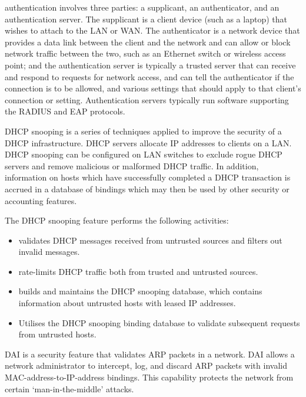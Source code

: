 {\begin{description}
    authentication involves three parties: a supplicant, an authenticator, and an authentication server.
   The supplicant is a client device (such as a laptop) that wishes to attach to the \ac{LAN} or \ac{WAN}.
   The authenticator is a network device that provides a data link between the client and the network and can allow or block network traffic between the two, such as an Ethernet switch or wireless access point; and the authentication server is typically a trusted server that can receive and respond to requests for network access, and can tell the authenticator if the connection is to be allowed, and various settings that should apply to that client's connection or setting.
   Authentication servers typically run software supporting the \ac{RADIUS} and \ac{EAP} protocols.
\item[\ac{DHCP} snooping]
   \ac{DHCP} snooping is a series of techniques applied to improve the security of a \ac{DHCP} infrastructure.
   \ac{DHCP} servers allocate \ac{IP} addresses to clients on a \ac{LAN}.
   \ac{DHCP} snooping can be configured on \ac{LAN} switches to exclude rogue \ac{DHCP} servers and remove malicious or malformed \ac{DHCP} traffic.
   In addition, information on hosts which have successfully completed a \ac{DHCP} transaction is accrued in a database of bindings which may then be used by other security or accounting features.
   
   The \ac{DHCP} snooping feature performs the following activities:
   \begin{itemize}
   \item validates \acs{DHCP} messages received from untrusted sources and filters out invalid messages.
   \item rate-limits \acs{DHCP} traffic both from trusted and untrusted sources.
   \item builds and maintains the \acs{DHCP} snooping database, which contains information about untrusted hosts with leased \acs{IP} addresses.
   \item Utilises the \acs{DHCP} snooping binding database to validate subsequent requests from untrusted hosts.
   \end{itemize}
\item[\acf{DAI}]
   \acl{DAI} is a security feature that validates \ac{ARP} packets in a network.
   \acs{DAI} allows a network administrator to intercept, log, and discard \ac{ARP} packets with invalid \acs{MAC}-address-to-\acs{IP}-address bindings.
   This capability protects the network from certain `man-in-the-middle' attacks.
\end{description}
}

